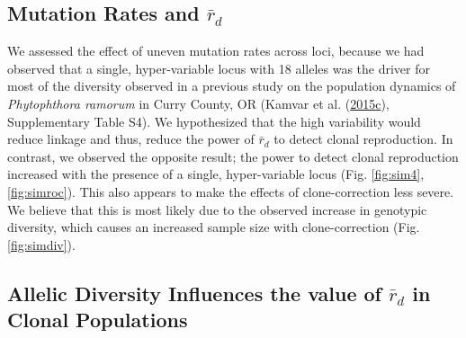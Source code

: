 \documentclass[double,11pt]{beavtex}
\begin{document}
  \subsection{\texorpdfstring{Mutation Rates and
  \(\bar{r}_d\)}{Mutation Rates and \textbackslash{}bar\{r\}\_d}}\label{mutation-rates-and-barr_d}
  
  We assessed the effect of uneven mutation rates across loci, because we
  had observed that a single, hyper-variable locus with 18 alleles was the
  driver for most of the diversity observed in a previous study on the
  population dynamics of \emph{Phytophthora ramorum} in Curry County, OR
  (Kamvar et al.
  (\protect\hyperlink{ref-kamvar2015spatial}{2015}\protect\hyperlink{ref-kamvar2015spatial}{c}),
  Supplementary Table S4). We hypothesized that the high variability would
  reduce linkage and thus, reduce the power of \(\bar{r}_d\) to detect
  clonal reproduction. In contrast, we observed the opposite result; the
  power to detect clonal reproduction increased with the presence of a
  single, hyper-variable locus (Fig. \ref{fig:sim4}, \ref{fig:simroc}).
  This also appears to make the effects of clone-correction less severe.
  We believe that this is most likely due to the observed increase in
  genotypic diversity, which causes an increased sample size with
  clone-correction (Fig. \ref{fig:simdiv}).
  
  \subsection{\texorpdfstring{Allelic Diversity Influences the value of
  \(\bar{r}_d\) in Clonal
  Populations}{Allelic Diversity Influences the value of \textbackslash{}bar\{r\}\_d in Clonal Populations}}\label{allelic-diversity-influences-the-value-of-barr_d-in-clonal-populations}
  
\end{document}
